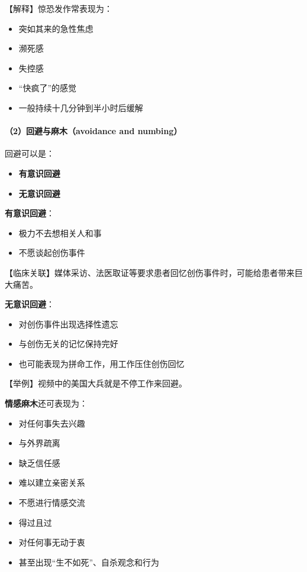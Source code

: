 \documentclass[
  chinese,
  9pt,
  a4paper,
]{ctexart}
\providecommand{\tightlist}{%
  \setlength{\itemsep}{0pt}\setlength{\parskip}{0pt}}
\begin{document}
【解释】惊恐发作常表现为：

\begin{itemize}
\tightlist
\item
  突如其来的急性焦虑
\item
  濒死感
\item
  失控感
\item
  ``快疯了''的感觉
\item
  一般持续十几分钟到半小时后缓解
\end{itemize}

\paragraph{（2）回避与麻木（avoidance and
numbing）}\label{ux56deux907fux4e0eux9ebbux6728avoidance-and-numbing}

回避可以是：

\begin{itemize}
\tightlist
\item
  \textbf{有意识回避}
\item
  \textbf{无意识回避}
\end{itemize}

\textbf{有意识回避}：

\begin{itemize}
\tightlist
\item
  极力不去想相关人和事
\item
  不愿谈起创伤事件
\end{itemize}

【临床关联】媒体采访、法医取证等要求患者回忆创伤事件时，可能给患者带来巨大痛苦。

\textbf{无意识回避}：

\begin{itemize}
\tightlist
\item
  对创伤事件出现选择性遗忘
\item
  与创伤无关的记忆保持完好
\item
  也可能表现为拼命工作，用工作压住创伤回忆
\end{itemize}

【举例】视频中的美国大兵就是不停工作来回避。

\textbf{情感麻木}还可表现为：

\begin{itemize}
\tightlist
\item
  对任何事失去兴趣
\item
  与外界疏离
\item
  缺乏信任感
\item
  难以建立亲密关系
\item
  不愿进行情感交流
\item
  得过且过
\item
  对任何事无动于衷
\item
  甚至出现``生不如死''、自杀观念和行为
\end{itemize}
\end{document}
